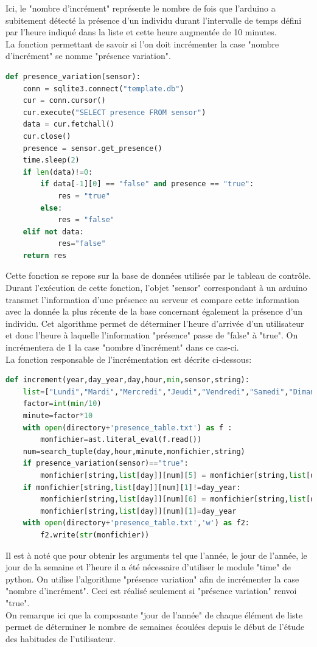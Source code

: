 \documentclass[12pt]{report}
\begin{document}
Ici, le "nombre d'incrément" représente le nombre de fois que l'arduino a subitement détecté la présence d'un individu durant l'intervalle de temps défini par l'heure indiqué dans la liste et cette heure augmentée de 10 minutes.\\
La fonction permettant de savoir si l'on doit incrémenter la case "nombre d'incrément" se nomme "présence variation".
\begin{lstlisting}[language=python]
def presence_variation(sensor):
    conn = sqlite3.connect("template.db")
    cur = conn.cursor()
    cur.execute("SELECT presence FROM sensor")
    data = cur.fetchall()
    cur.close()
    presence = sensor.get_presence()
    time.sleep(2)
    if len(data)!=0:
        if data[-1][0] == "false" and presence == "true":
            res = "true"
        else:
            res = "false"
    elif not data:
            res="false"
    return res
\end{lstlisting}
\vspace{0.2cm}
Cette fonction se repose sur la base de données utilisée par le tableau de contrôle.
Durant l'exécution de cette fonction, l'objet "sensor" correspondant à un arduino transmet l'information d'une présence au serveur et compare cette information avec la donnée la plus récente de la base concernant également la présence d'un individu.
Cet algorithme permet de déterminer l'heure d'arrivée d'un utilisateur et donc l'heure à laquelle l'information "présence" passe de "false" à "true". On incrémentera de 1 la case "nombre d'incrément" dans ce cas-ci.\\
\newpage
La fonction responsable de l'incrémentation est décrite ci-dessous:\\

\begin{lstlisting}[language=python]
def increment(year,day_year,day,hour,min,sensor,string):
    list=["Lundi","Mardi","Mercredi","Jeudi","Vendredi","Samedi","Dimanche"]
    factor=int(min/10)
    minute=factor*10
    with open(directory+'presence_table.txt') as f :
        monfichier=ast.literal_eval(f.read())
    num=search_tuple(day,hour,minute,monfichier,string)
    if presence_variation(sensor)=="true":
        monfichier[string,list[day]][num][5] = monfichier[string,list[day]][num][5] +1
    if monfichier[string,list[day]][num][1]!=day_year:
        monfichier[string,list[day]][num][6] = monfichier[string,list[day]][num][6]+1
        monfichier[string,list[day]][num][1]=day_year
    with open(directory+'presence_table.txt','w') as f2:
        f2.write(str(monfichier))
\end{lstlisting}
\vspace{0.2cm}
Il est à noté que pour obtenir les arguments tel que l'année, le jour de l'année, le jour de la semaine et l'heure il a été nécessaire d'utiliser le module "time" de python.
On utilise l'algorithme "présence variation" afin de incrémenter la case "nombre d'incrément". Ceci est réalisé seulement si "présence variation" renvoi "true".\\
On remarque ici que la composante "jour de l'année" de chaque élément de liste permet de déterminer le nombre de semaines écoulées depuis le début de l'étude des habitudes de l'utilisateur.
\end{document}
